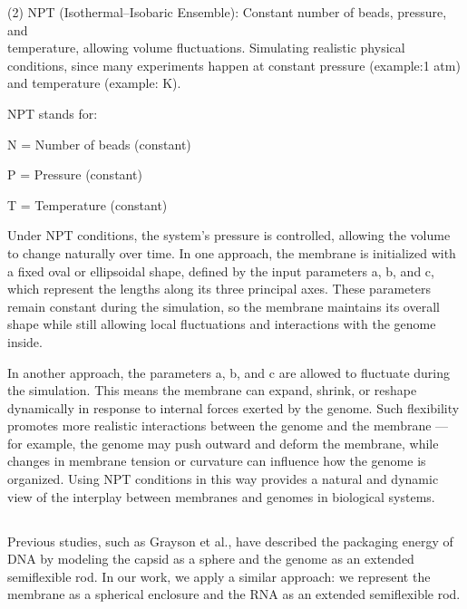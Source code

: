 \documentclass[12pt]{article}
\begin{document}
\begin{flushleft}
   
   
   
   

(2) NPT (Isothermal–Isobaric Ensemble): Constant number of beads, pressure, and \\
  \indent temperature, allowing volume fluctuations. Simulating realistic physical conditions, since 
  \indent many experiments happen at constant pressure (example:1 atm) and temperature  (example: 
   K).

NPT stands for:

  \indent\indent  N = Number of beads (constant)

  \indent\indent  P = Pressure (constant)

  \indent\indent  T = Temperature (constant)
    
    Under NPT conditions, the system’s pressure is controlled, allowing the volume to change naturally over time. In one approach, the membrane is initialized with a fixed oval or ellipsoidal shape, defined by the input parameters a, b, and c, which represent the lengths along its three principal axes. These parameters remain constant during the simulation, so the membrane maintains its overall shape while still allowing local fluctuations and interactions with the genome inside.

In another approach, the parameters a, b, and c are allowed to fluctuate during the simulation. This means the membrane can expand, shrink, or reshape dynamically in response to internal forces exerted by the genome. Such flexibility promotes more realistic interactions between the genome and the membrane — for example, the genome may push outward and deform the membrane, while changes in membrane tension or curvature can influence how the genome is organized. Using NPT conditions in this way provides a natural and dynamic view of the interplay between membranes and genomes in biological systems.
         
   

\subsection*{}


Previous studies, such as Grayson et al.\cite{Grayson2006}, have described the packaging energy of DNA by modeling the capsid as a sphere and the genome as an extended semiflexible rod. In our work, we apply a similar approach: we represent the membrane as a spherical enclosure and the RNA as an extended semiflexible rod.


\end{flushleft}
\end{document}
